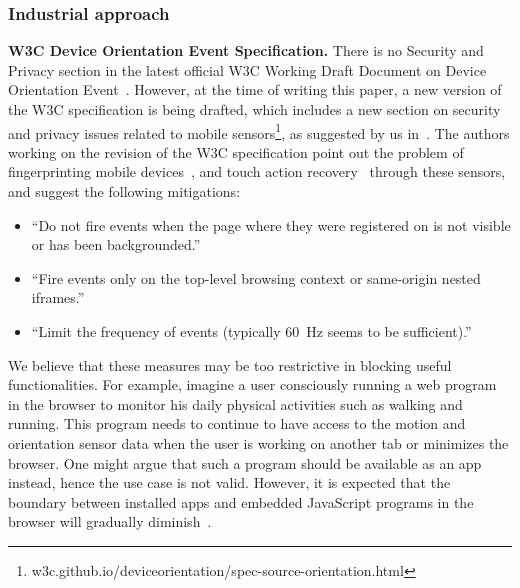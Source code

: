 \documentclass[10pt,twocolumn]{article}
\begin{document}
\subsubsection{Industrial approach} 

\textbf{W3C Device Orientation Event Specification.}
There is no Security and Privacy section in the latest official W3C Working Draft Document on Device Orientation Event~\cite{W3CMotion}. However, at the time of writing this paper, a new version of the W3C specification is being drafted, which includes a new section on security and privacy issues related to mobile sensors\footnote{w3c.github.io/deviceorientation/spec-source-orientation.html}, as suggested by us in~\cite{Mehrnezhad}.  
The authors working on the revision of the W3C specification point out the problem of fingerprinting mobile devices~\cite{fin}, and touch action recovery~\cite{Mehrnezhad} through these sensors, and suggest the following mitigations: 
\begin{itemize}
\item ``Do not fire events when the page where they were registered on is not visible or has been backgrounded.''
\item ``Fire events only on the top-level browsing context or same-origin nested iframes.''
\item ``Limit the frequency of events (typically 60~Hz seems to be sufficient).''
\end{itemize}

We believe that these measures may be too restrictive in blocking useful functionalities. For example, imagine a user consciously running a web program in the browser to monitor his daily physical activities such as walking and running. This program needs to continue to have access to the motion and orientation sensor data when the user is working on another tab or minimizes the browser. One might argue that such a program should be available as an app instead, hence the use case is not valid. However, it is expected that the boundary between installed apps and embedded JavaScript programs in the browser will gradually diminish~\cite{webvnative}. 
\end{document}
